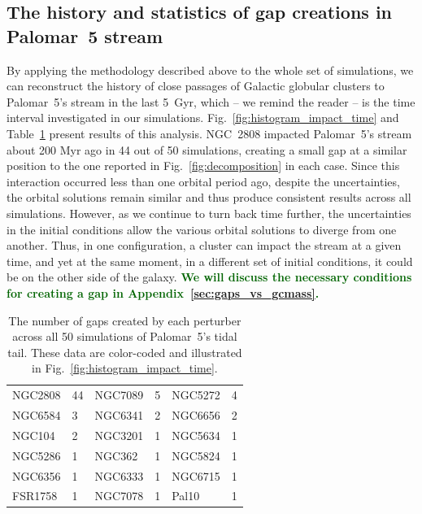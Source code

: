 \documentclass{aa}
\newcommand{\salvatore}[1]{\textcolor{darkgreen}{{#1}}}
\begin{document}
  \subsection{The history and statistics of gap creations in Palomar~5 stream}\label{sect:history}
  

      


    By applying the methodology described above to the whole set of simulations, we can reconstruct the history of close passages of Galactic globular clusters to Palomar~5's stream in the last 5~Gyr, which -- we remind the reader -- is the time interval investigated in our simulations.  Fig.~\ref{fig:histogram_impact_time} and Table~\ref{tab:gaps_per_perturber} present results of this analysis. NGC~2808 impacted Palomar~5's stream about 200 Myr ago in 44 out of 50 simulations, creating a small gap at a similar position to the one reported in Fig.~\ref{fig:decomposition} in each case. Since this interaction occurred less than one orbital period ago, despite the uncertainties, the orbital solutions remain similar and thus produce consistent results across all simulations. However, as we continue to turn back time further, the uncertainties in the initial conditions allow the various orbital solutions to diverge from one another. Thus, in one configuration, a cluster can impact the stream at a given time, and yet at the same moment, in a different set of initial conditions, it could be on the other side of the galaxy. \textbf{\salvatore{We will discuss the necessary conditions for creating a gap in Appendix~\ref{sec:gaps_vs_gcmass}. }}
    

    \begin{table}[h]
      \centering
      \begin{tabular}{|ll|ll|ll|}
      \hline
      NGC2808 & 44 & NGC7089 & 5 & NGC5272 & 4 \\
      NGC6584 & 3 & NGC6341 & 2 & NGC6656 & 2 \\
      NGC104 & 2 & NGC3201 & 1 & NGC5634 & 1 \\
      NGC5286 & 1 & NGC362 & 1 & NGC5824 & 1 \\
      NGC6356 & 1 & NGC6333 & 1 & NGC6715 & 1 \\
      FSR1758 & 1 & NGC7078 & 1 & Pal10 & 1 \\
      \hline
      \end{tabular}
      \caption{The number of gaps created by each perturber across all 50 simulations of Palomar~5's tidal tail. These data are color-coded and illustrated in Fig.~\ref{fig:histogram_impact_time}.}
      \label{tab:gaps_per_perturber}
    \end{table} 
    
\end{document}
